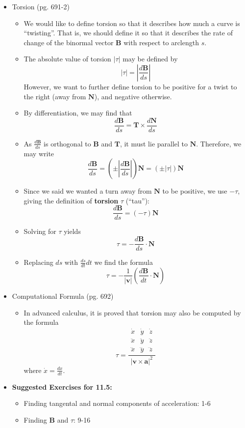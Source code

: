 \documentclass[12pt]{article}
\renewcommand{\vec}[1]{\mathbf{#1}}
\newcommand{\<}{\left<}
\renewcommand{\>}{\right>}
\begin{document}
\begin{itemize}
  \item Torsion (pg. 691-2)
  
    \begin{itemize}
    \item We would like to define torsion so that it describes how much a curve is ``twisting''. That is, we should define it so that it describes the rate of change of the binormal vector $\vec{B}$ with respect to arclength $s$.
    \item The absolute value of torsion $|\tau|$ may be defined by \[|\tau| = \left|\frac{d\vec{B}}{ds}\right|\] However, we want to further define torsion to be positive for a twist to the right (away from $\vec{N}$), and negative otherwise. 
    \item By differentiation, we may find that \[\frac{d\vec{B}}{ds} = \vec{T} \times \frac{d\vec{N}}{ds}\]
    \item As $\frac{d\vec{B}}{ds}$ is orthogonal to $\vec{B}$ and $\vec{T}$, it must lie parallel to $\vec{N}$.  Therefore, we may write \[\frac{d\vec{B}}{ds} = \left(\pm\left|\frac{d\vec{B}}{ds}\right|\right)\vec{N}=(\pm|\tau|)\vec{N}\]
    \item Since we said we wanted a turn away from $\vec{N}$ to be positive, we use $-\tau$, giving the definition of \textbf{torsion} $\tau$ (``tau''): \[\frac{d\vec{B}}{ds} = (-\tau)\vec{N}\]
    \item Solving for $\tau$ yields \[\tau = -\frac{d\vec{B}}{ds}\cdot \vec{N}\]
    \item Replacing $ds$ with $\frac{ds}{dt}dt$ we find the formula \[\tau = -\frac{1}{|\vec{v}|}\left(\frac{d\vec{B}}{dt}\cdot\vec{N}\right)\]
    \end{itemize}
    \newpage
  \item Computational Formula (pg. 692)

    \begin{itemize}
    \item In advanced calculus, it is proved that torsion may also be computed by the formula
  \[
  \tau
  =
  \frac{
  \begin{array}{|ccc|}
  \dot{x} & \dot{y} & \dot{z} \\
  \ddot{x} & \ddot{y} & \ddot{z} \\
  \dddot{x} & \dddot{y} & \dddot{z}
  \end{array}
  }{
  |\vec{v}\times\vec{a}|^2
  }
  \]
  where $\dot{x}=\frac{dx}{dt}$.
    \end{itemize}
    
  \item \textbf{ Suggested Exercises for 11.5:}
  
    \begin{itemize}
    \item Finding tangental and normal components of acceleration: 1-6
    \item Finding $\vec{B}$ and $\tau$: 9-16
    \end{itemize}
  
  \end{itemize}
  
\end{document}
